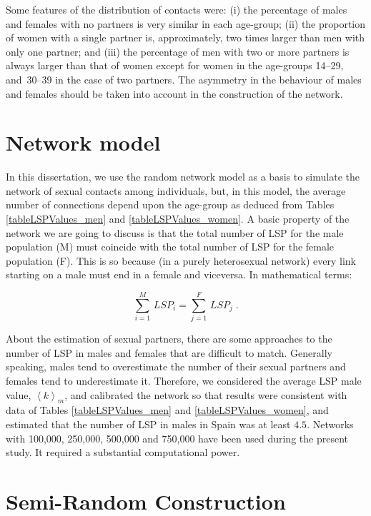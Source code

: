 Some features of the distribution of contacts were: (i) the percentage of males and females with no partners is
very similar in each age-group; (ii) the proportion of women  with a single partner is, approximately, two times larger than men with only one partner; and (iii) the percentage of men with two or more partners is always larger than that of women except for women in the age-groups 14--29, and~30--39 in the case of two partners. The asymmetry in the behaviour of males and females should be taken into account in the construction of the network.

\section{Network model}

In this dissertation, we use the random network model as a basis to simulate the network of sexual contacts among individuals, but, in this model, the average number of connections depend upon the age-group as deduced from Tables \ref{tableLSPValues_men} and \ref{tableLSPValues_women}. A basic property of the network we are going to discuss is that the total number of LSP for the male population (M) must coincide with the total number of LSP for the female population (F). This is so because (in a purely heterosexual network) every link starting on a male must end in a female and viceversa. In mathematical terms:

\begin{equation}
\label{nodeseq}
\displaystyle\sum_{i=1}^M\, LSP_i=\displaystyle\sum_{j=1}^F\, LSP_j\; .
\end{equation}

About the estimation of sexual partners, there are some approaches to the number of LSP in males and females \cite{chandra2013sexual,mosher2005sexual} that are difficult to match. Generally speaking, males tend to overestimate the number of their sexual partners and females tend to underestimate it. Therefore, we considered the average LSP male value, $\left\langle k \right\rangle_m$, and calibrated the network so that results were consistent with data of Tables \ref{tableLSPValues_men} and \ref{tableLSPValues_women}, and estimated that the number of LSP in males in Spain was at least $4.5$. Networks with 100,000, 250,000, 500,000 and 750,000 have been used during the present study. It required a substantial computational power.

\section{Semi-Random Construction}
\label{subsec22}

